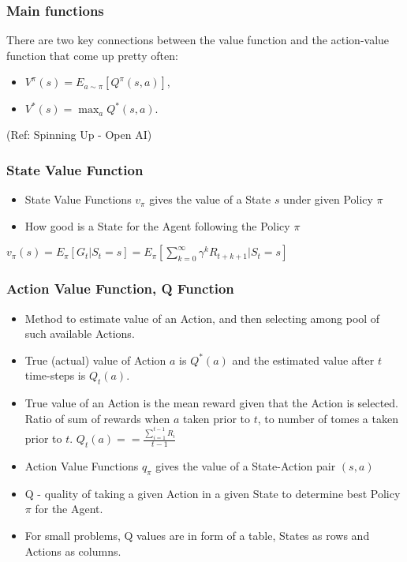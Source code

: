 \begin{frame}[fragile]\frametitle{Main functions}

There are two key connections between the value function and the action-value function that come up pretty often:

\begin{itemize}
\item $V^{\pi}(s) = E_{a\sim \pi}[Q^{\pi}(s,a)]$,
\item $V^*(s) = \max_a Q^* (s,a).$
\end{itemize}

{\tiny (Ref: Spinning Up - Open AI)}
\end{frame}


\begin{frame}[fragile]\frametitle{State Value Function}

\begin{itemize}
\item State Value Functions $v_{\pi}$ gives the value of a State $s$ under given Policy $\pi$
\item How good is a State for the Agent following the Policy $\pi$
\end{itemize}

$v_{\pi}(s) = E_{\pi}[G_t | S_t = s] = E_{\pi}[\sum_{k=0}^{\infty}\gamma^kR_{t+k+1}|S_t=s]$

\end{frame}

\begin{frame}[fragile]\frametitle{Action Value Function, Q Function}

\begin{itemize}
\item Method to estimate value of an Action, and then selecting among pool of such available Actions.
\item True (actual) value of Action $a$ is $Q^*(a)$ and the estimated value after $t$ time-steps is $Q_t(a)$.
\item True value of an Action is the mean reward given that the Action is selected. Ratio of sum of rewards when $a$ taken prior to $t$, to number of tomes a taken prior to $t$. $Q_t(a) = = \frac{\sum_{i=1}^{t-1} R_i}{t-1}$
\item Action Value Functions $q_{\pi}$ gives the value of a State-Action pair $(s,a)$ 
\item Q - quality of taking a given Action in a given State to determine best Policy $\pi$ for the Agent.
\item For small problems, Q values are in form of a table, States as rows and Actions as columns.
\end{itemize}

\end{frame}



